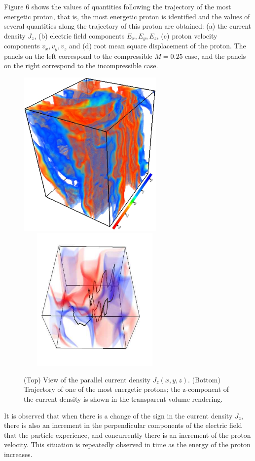 \documentclass[%
aip,pop,amsmath,amssymb,
 reprint,%
]{revtex4-1}
\begin{document}
{{Figure 6 shows the values of quantities following the trajectory of the
most energetic proton, that is, the most energetic proton is identified
and the values of several quantities along the trajectory of this proton
are obtained: (a) the current density $J_z$, (b) electric field 
components $E_x, E_y, E_z$, (c) proton velocity components $v_x, v_y, v_z$ and (d) root
mean square displacement of the proton. The panels on the left correspond to the
compressible $M=0.25$ case, and the panels on the right correspond to the incompressible case.


\begin{figure}[h!]
\begin{center}
{\includegraphics[width = 2.8in]{./Figures/Fig5_a}}
{\includegraphics[height=2.8in, width = 3in]{./Figures/Fig5_b}}
\caption{(Top) View of the parallel current density $J_z(x,y,z)$.
(Bottom) Trajectory of one of the most energetic protons; the z-component of the current 
density is shown in the transparent volume rendering.}
\end{center}
\label{mean square velocity}
\end{figure}
It is observed that when there is a change of the sign in the 
current density $J_z$, there is also an increment in the 
perpendicular components of the electric field that 
the particle experience, and concurrently there is an increment 
of the proton velocity. This situation
is repeatedly observed in time as the energy of the proton increases.

}}
\end{document}
